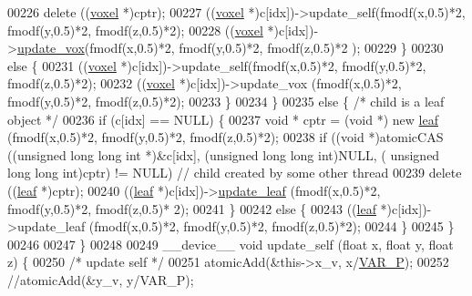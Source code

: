 \begin{DoxyCode}
{00226                     \textcolor{keyword}{delete} ((\hyperlink{classvoxel}{voxel} *)cptr);
00227                 ((\hyperlink{classvoxel}{voxel} *)c[idx])->update\_self(fmodf(x,0.5)*2, fmodf(y,0.5)*2, fmodf(z,0.5)*2);
00228                 ((\hyperlink{classvoxel}{voxel} *)c[idx])->\hyperlink{classvoxel_ae550590cfe0d4c3d0e78cbf0cfa3390f}{update\_vox}(fmodf(x,0.5)*2, fmodf(y,0.5)*2, fmodf(z,0.5)*2
      );
00229             \}
00230             \textcolor{keywordflow}{else} \{
00231                 ((\hyperlink{classvoxel}{voxel} *)c[idx])->update\_self(fmodf(x,0.5)*2, fmodf(y,0.5)*2, fmodf(z,0.5)*2);
00232                 ((\hyperlink{classvoxel}{voxel} *)c[idx])->update\_vox (fmodf(x,0.5)*2, fmodf(y,0.5)*2, fmodf(z,0.5)*2);
00233             \}
00234         \}
00235         \textcolor{keywordflow}{else} \{ \textcolor{comment}{/* child is a leaf object */}
00236             \textcolor{keywordflow}{if} (c[idx] == NULL) \{
00237                 \textcolor{keywordtype}{void} * cptr = (\textcolor{keywordtype}{void} *) \textcolor{keyword}{new} \hyperlink{classleaf}{leaf} (fmodf(x,0.5)*2, fmodf(y,0.5)*2, fmodf(z,0.5)*2);
00238                 \textcolor{keywordflow}{if} ((\textcolor{keywordtype}{void} *)atomicCAS ((\textcolor{keywordtype}{unsigned} \textcolor{keywordtype}{long} \textcolor{keywordtype}{long} \textcolor{keywordtype}{int} *)&c[idx], (\textcolor{keywordtype}{unsigned} \textcolor{keywordtype}{long} \textcolor{keywordtype}{long} \textcolor{keywordtype}{int})NULL, (\textcolor{keywordtype}{
      unsigned} \textcolor{keywordtype}{long} \textcolor{keywordtype}{long} \textcolor{keywordtype}{int})cptr) != NULL) \textcolor{comment}{// child created by some other thread}
00239                     \textcolor{keyword}{delete} ((\hyperlink{classleaf}{leaf} *)cptr);
00240                 ((\hyperlink{classleaf}{leaf} *)c[idx])->\hyperlink{classleaf_adacc1e0d36163c7fd0a7c31576ecf4e8}{update\_leaf} (fmodf(x,0.5)*2, fmodf(y,0.5)*2, fmodf(z,0.5)*
      2);
00241             \}
00242             \textcolor{keywordflow}{else} \{
00243                 ((\hyperlink{classleaf}{leaf} *)c[idx])->update\_leaf (fmodf(x,0.5)*2, fmodf(y,0.5)*2, fmodf(z,0.5)*2);
00244             \}
00245         \}
00246 
00247     \}
00248 
00249     \_\_device\_\_ \textcolor{keywordtype}{void} update\_self (\textcolor{keywordtype}{float} x, \textcolor{keywordtype}{float} y, \textcolor{keywordtype}{float} z) \{
00250         \textcolor{comment}{/* update self */}
00251         atomicAdd(&this->x\_v, x/\hyperlink{Voxel_8hpp_ae1cd6283839fc3aebf9bccbd1044a365}{VAR\_P});
00252         \textcolor{comment}{//atomicAdd(&y\_v, y/VAR\_P);}
}
\end{DoxyCode}
